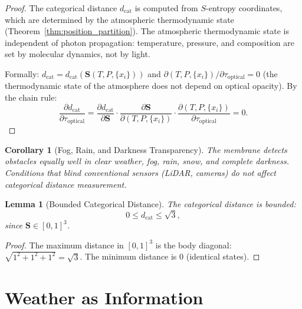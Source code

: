 \documentclass[12pt]{article}
\newtheorem{lemma}[theorem]{Lemma}
\newtheorem{corollary}[theorem]{Corollary}
\theoremstyle{definition}
\theoremstyle{remark}
\newcommand{\dcat}{d_{\mathrm{cat}}}
\begin{document}
\begin{proof}
The categorical distance $\dcat$ is computed from $S$-entropy coordinates, which are determined by the atmospheric thermodynamic state (Theorem~\ref{thm:position_partition}). The atmospheric thermodynamic state is independent of photon propagation: temperature, pressure, and composition are set by molecular dynamics, not by light.

Formally: $\dcat = \dcat(\mathbf{S}(T, P, \{x_i\}))$ and $\partial(T, P, \{x_i\})/\partial\tau_{\mathrm{optical}} = 0$ (the thermodynamic state of the atmosphere does not depend on optical opacity). By the chain rule:
\begin{equation}
  \frac{\partial \dcat}{\partial \tau_{\mathrm{optical}}} = \frac{\partial \dcat}{\partial \mathbf{S}} \cdot \frac{\partial \mathbf{S}}{\partial(T,P,\{x_i\})} \cdot \frac{\partial(T,P,\{x_i\})}{\partial\tau_{\mathrm{optical}}} = 0.
  \label{eq:opacity_proof}
\end{equation}
\end{proof}

\begin{corollary}[Fog, Rain, and Darkness Transparency]
\label{cor:weather_transparency}
The membrane detects obstacles equally well in clear weather, fog, rain, snow, and complete darkness. Conditions that blind conventional sensors (LiDAR, cameras) do not affect categorical distance measurement.
\end{corollary}

\begin{lemma}[Bounded Categorical Distance]
\label{lem:bounded_distance}
The categorical distance is bounded:
\begin{equation}
  0 \leq \dcat \leq \sqrt{3},
  \label{eq:bounded_distance}
\end{equation}
since $\mathbf{S} \in [0,1]^3$.
\end{lemma}

\begin{proof}
The maximum distance in $[0,1]^3$ is the body diagonal: $\sqrt{1^2 + 1^2 + 1^2} = \sqrt{3}$. The minimum distance is 0 (identical states).
\end{proof}


\section{Weather as Information}
\label{sec:weather}
\end{document}

